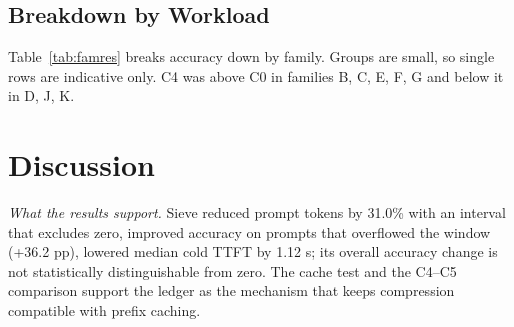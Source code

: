 \documentclass[journal]{IEEEtran}
\begin{document}
\subsection{Breakdown by Workload}
\begin{table}[t]\centering\caption{Accuracy by workload family (bold: above C0 on the same questions).}\label{tab:famres}
\end{table}
Table~\ref{tab:famres} breaks accuracy down by family. Groups are small, so single rows are indicative only. C4 was above C0 in families B, C, E, F, G and below it in D, J, K.

\section{Discussion}\label{sec:discussion}
\textit{What the results support.} Sieve reduced prompt tokens by 31.0\% with an interval that excludes zero, improved accuracy on prompts that overflowed the window (+36.2 pp), lowered median cold TTFT by 1.12 s; its overall accuracy change is not statistically distinguishable from zero. The cache test and the C4--C5 comparison support the ledger as the mechanism that keeps compression compatible with prefix caching.
\end{document}
